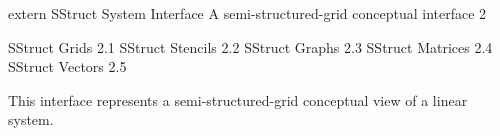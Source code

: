 \documentclass{article}
\begin{document}
\begin{cxxentry}
{extern }
        {SStruct System Interface}
        {}
        {A semi-structured-grid conceptual interface}
        {2}
\begin{cxxnames}
\cxxitem{}
        {SStruct Grids}
        {}
        {
}
        {2.1}
\cxxitem{}
        {SStruct Stencils}
        {}
        {
}
        {2.2}
\cxxitem{}
        {SStruct Graphs}
        {}
        {
}
        {2.3}
\cxxitem{}
        {SStruct Matrices}
        {}
        {
}
        {2.4}
\cxxitem{}
        {SStruct Vectors}
        {}
        {
}
        {2.5}
\end{cxxnames}
\begin{cxxdoc}


This interface represents a semi-structured-grid conceptual view of a linear
system.



\end{cxxdoc}
\end{cxxentry}
\end{document}
